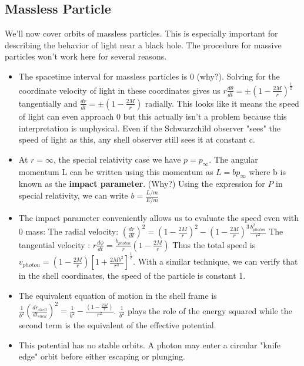 \documentclass[11pt]{article}
\begin{document}
\subsection{Massless Particle}
We'll now cover orbits of massless particles. This is especially important for describing the behavior of light near a black hole. The procedure for massive particles won't work here for several reasons.
    \begin{itemize}
        \item The spacetime interval for massless particles is 0 (why?). Solving for the coordinate velocity of light in these coordinates gives us $r\frac{d\theta}{dt} = \pm (1-\frac{2M}{r})^\frac{1}{2}$ tangentially and
        $\frac{dr}{dt} = \pm (1 - \frac{2M}{r})$ radially. This looks like it
        means the speed of light can even approach 0 but this actually isn't a problem because this interpretation is unphysical. Even if the Schwarzchild observer "sees" the speed of light as this, any shell observer still 
        sees it at constant c.
        \item At $r = \infty$, the special relativity case we have $p = p_{\infty}$. The angular momentum L can be written using this momentum as $L = bp_{\infty}$ where b is known as the \textbf{impact parameter}. (Why?)
        Using the expression for $P$ in special relativity, we can write $b = \frac{L/m}{E/m}$

        \item The impact parameter conveniently allows us to evaluate the speed even with 0 mass: 
        \newline The radial velocity: $(\frac{dr}{dt})^2 = (1 - \frac{2M}{r})^2 - (1 - \frac{2M}{r})^3\frac{b_{photon}^2}{r^2}$ 
        \newline The tangential velocity : $r\frac{d\phi}{dt} = \frac{b_{photon}}{r}(1 - \frac{2M}{r})$
        \newline Thus the total speed is $v_{photon} = (1 - \frac{2M}{r})[1 + \frac{2Mb^2}{r^3}]^\frac{1}{2}$.
        \newline With a similar technique, we can verify that in the shell coordinates, the speed of the particle is constant 1.

        \item The equivalent equation of motion in the shell frame is $\frac{1}{b^2}(\frac{dr_{shell}}{dt_{shell}})^2 = \frac{1}{b^2} - \frac{(1 - \frac{2M}r)}{r^2}$. $\frac{1}{b^2}$ plays the role of the energy squared while
        the second term is the equivalent of the effective potential.

        \item This potential has no stable orbits. A photon may enter a circular "knife edge" orbit before either escaping or plunging.
    \end{itemize}
\end{document}
